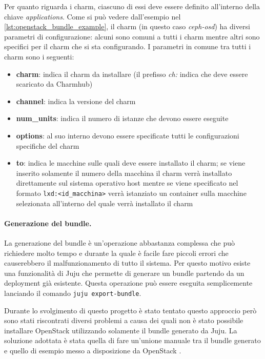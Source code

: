 Per quanto riguarda i charm, ciascuno di essi deve essere definito all'interno della chiave \emph{applications}. Come si può vedere dall'esempio nel \cref{lst:openstack_bundle_example}, il charm (in questo caso \emph{ceph-osd}) ha diversi parametri di configurazione: alcuni sono comuni a tutti i charm mentre altri sono specifici per il charm che si sta configurando. I parametri in comune tra tutti i charm sono i seguenti:
\begin{itemize}
    \item \textbf{charm}: indica il charm da installare (il prefisso \emph{ch:} indica che deve essere scaricato da Charmhub)
    \item \textbf{channel}: indica la versione del charm
    \item \textbf{num\_units}: indica il numero di istanze che devono essere eseguite
    \item \textbf{options}: al suo interno devono essere specificate tutti le configurazioni specifiche del charm
    \item \textbf{to}: indica le macchine sulle quali deve essere installato il charm; se viene inserito solamente il numero della macchina il charm verrà installato direttamente sul sistema operativo host mentre se viene specificato nel formato \verb|lxd:<id_macchina>| verrà istanziato un container sulla macchine selezionata all'interno del quale verrà installato il charm
\end{itemize}

\paragraph{Generazione del bundle.} La generazione del bundle è un'operazione abbastanza complessa che può richiedere molto tempo e durante la quale è facile fare piccoli errori che causerebbero il malfunzionamento di tutto il sistema. Per questo motivo esiste una funzionalità di Juju che permette di generare un bundle partendo da un deployment già esistente. Questa operazione può essere eseguita semplicemente lanciando il comando \verb|juju export-bundle|.

Durante lo svolgimento di questo progetto è stato tentato questo approccio però sono stati riscontrati diversi problemi a causa dei quali non è stato possibile installare OpenStack utilizzando solamente il bundle generato da Juju. La soluzione adottata è stata quella di fare un'unione manuale tra il bundle generato e quello di esempio messo a disposizione da OpenStack \cite{openstack_example_bundle}.

